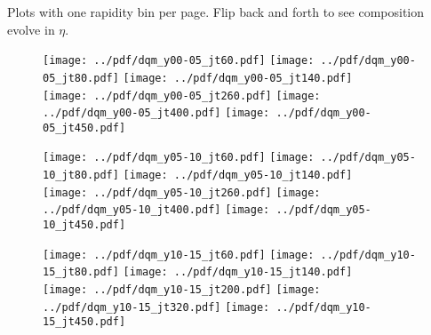 \documentclass[landscape,10pt]{beamer} %
\begin{document}
\newpage

Plots with one rapidity bin per page. Flip back and forth to see composition evolve in $\eta$.

\newpage

\begin{figure}[p]
\texttt{[image: ../pdf/dqm\_y00-05\_jt60.pdf]}
\texttt{[image: ../pdf/dqm\_y00-05\_jt80.pdf]}
\texttt{[image: ../pdf/dqm\_y00-05\_jt140.pdf]}\\
\texttt{[image: ../pdf/dqm\_y00-05\_jt260.pdf]}
\texttt{[image: ../pdf/dqm\_y00-05\_jt400.pdf]}
\texttt{[image: ../pdf/dqm\_y00-05\_jt450.pdf]}
\end{figure}

\newpage

\begin{figure}[p]
\texttt{[image: ../pdf/dqm\_y05-10\_jt60.pdf]}
\texttt{[image: ../pdf/dqm\_y05-10\_jt80.pdf]}
\texttt{[image: ../pdf/dqm\_y05-10\_jt140.pdf]}\\
\texttt{[image: ../pdf/dqm\_y05-10\_jt260.pdf]}
\texttt{[image: ../pdf/dqm\_y05-10\_jt400.pdf]}
\texttt{[image: ../pdf/dqm\_y05-10\_jt450.pdf]}
\end{figure}

\newpage

\begin{figure}[p]
\texttt{[image: ../pdf/dqm\_y10-15\_jt60.pdf]}
\texttt{[image: ../pdf/dqm\_y10-15\_jt80.pdf]}
\texttt{[image: ../pdf/dqm\_y10-15\_jt140.pdf]}\\
\texttt{[image: ../pdf/dqm\_y10-15\_jt200.pdf]}
\texttt{[image: ../pdf/dqm\_y10-15\_jt320.pdf]}
\texttt{[image: ../pdf/dqm\_y10-15\_jt450.pdf]}
\end{figure}
\end{document}
